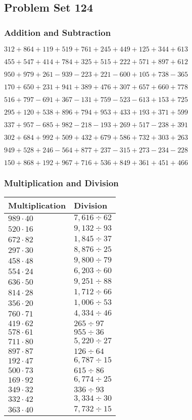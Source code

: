\hypertarget{problem-set-124}{%
\subsection{Problem Set 124}\label{problem-set-124}}

\hypertarget{addition-and-subtraction}{%
\subsubsection{Addition and
Subtraction}\label{addition-and-subtraction}}

\(312 +864 +119 +519 +761 +245 +449 +125 +344 +613\)

\(455 +547 +414 +784 +325 +515 +222 +571 +897 +612\)

\(950 +979 +261 - 939 - 223 +221 - 600 +105 +738 - 365\)

\(170 +650 +231 +941 +389 +476 +307 +657 +660 +778\)

\(516 +797 - 691 +367 - 131 +759 - 523 - 613 +153 +725\)

\(295 +120 +538 +896 +794 +953 +433 +193 +371 +599\)

\(337 +957 - 685 +982 - 218 - 193 +269 +517 - 238 +391\)

\(302 +684 +992 +509 +432 +679 +586 +732 +303 +263\)

\(949 +528 +246 - 564 +877 +237 - 315 +273 - 234 - 228\)

\(150 +868 +192 +967 +716 +536 +849 +361 +451 +466\)

\hypertarget{multiplication-and-division}{%
\subsubsection{Multiplication and
Division}\label{multiplication-and-division}}

\begin{longtable}[]{@{}ll@{}}
\toprule
Multiplication & Division\tabularnewline
\midrule
\endhead
\(989 \cdot 40\) & \(7,616÷62\)\tabularnewline
\(520 \cdot 16\) & \(9,132÷93\)\tabularnewline
\(672 \cdot 82\) & \(1,845÷37\)\tabularnewline
\(297 \cdot 30\) & \(8,876÷25\)\tabularnewline
\(458 \cdot 48\) & \(9,800÷79\)\tabularnewline
\(554 \cdot 24\) & \(6,203÷60\)\tabularnewline
\(636 \cdot 50\) & \(9,251÷88\)\tabularnewline
\(814 \cdot 28\) & \(1,712÷66\)\tabularnewline
\(356 \cdot 20\) & \(1,006÷53\)\tabularnewline
\(760 \cdot 71\) & \(4,334÷46\)\tabularnewline
\(419 \cdot 62\) & \(265÷97\)\tabularnewline
\(578 \cdot 61\) & \(955÷36\)\tabularnewline
\(711 \cdot 80\) & \(5,220÷27\)\tabularnewline
\(897 \cdot 87\) & \(126÷64\)\tabularnewline
\(192 \cdot 47\) & \(6,787÷15\)\tabularnewline
\(500 \cdot 73\) & \(615÷86\)\tabularnewline
\(169 \cdot 92\) & \(6,774÷25\)\tabularnewline
\(349 \cdot 32\) & \(336÷93\)\tabularnewline
\(332 \cdot 42\) & \(3,334÷30\)\tabularnewline
\(363 \cdot 40\) & \(7,732÷15\)\tabularnewline
\bottomrule
\end{longtable}
